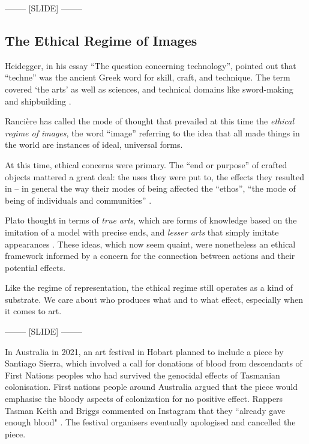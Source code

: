 \documentclass[letter:wpaper]{article}
\begin{document}
-------- [SLIDE] --------

    \subsection{The Ethical Regime of Images}

    Heidegger, in his essay ``The question concerning technology'', pointed out that ``techne'' was the ancient Greek word for skill, craft, and technique. The term covered ‘the arts’ as well as sciences, and technical domains like sword-making and shipbuilding \citep[p34]{HeideggerThQstnCncrngTchnlgy1954}.
    
    Rancière has called the mode of thought that prevailed at this time the \emph{ethical regime of images}, the word ``image'' referring to the idea that all made things in the world are instances of ideal, universal forms.

    At this time, ethical concerns were primary. The ``end or purpose'' of crafted objects mattered a great deal: the uses they were put to, the effects they resulted in -- in general the way their modes of being affected the ``ethos'', ``the mode of being of individuals and communities'' \citep[pp.20–21]{RancierPltcsOfThAsthtcs2004}.

    Plato thought in terms of \emph{true arts}, which are forms of knowledge based on the imitation of a model with precise ends, and \emph{lesser arts} that simply imitate appearances \citep[p.20]{RancierPltcsOfThAsthtcs2004}. These ideas, which now seem quaint, were nonetheless an ethical framework informed by a concern for the connection between actions and their potential effects.

    Like the regime of representation, the ethical regime still operates as a kind of substrate. We care about who produces what and to what effect, especially when it comes to art.
    
-------- [SLIDE] --------

    In Australia in 2021, an art festival in Hobart planned to include a piece by Santiago Sierra, which involved a call for donations of blood from descendants of First Nations peoples who had survived the genocidal effects of Tasmanian colonisation. First nations people around Australia argued that the piece would emphasise the bloody aspects of colonization for no positive effect. Rappers Tasman Keith and Briggs commented on Instagram that they ``already gave enough blood" \citep{DrkMfBld2021}. The festival organisers eventually apologised and cancelled the piece.
    
\end{document}
